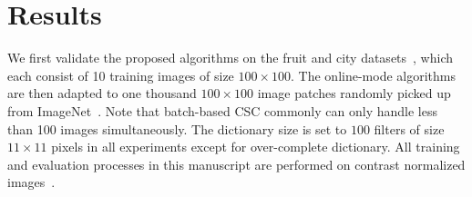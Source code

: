\section{Results} \label{sec:result}
We first validate the proposed algorithms on the fruit and city
datasets~\cite{zeiler2010deconvolutional}, which each consist of 10
training images of size $100 \times 100$. The online-mode algorithms
are then adapted to one thousand $100 \times 100$ image patches
randomly picked up from ImageNet~\cite{deng2009imagenet}. Note that
batch-based CSC commonly can only handle less than 100 images
simultaneously. The dictionary size is set to $100$ filters of size
$11 \times 11$ pixels in all experiments except for over-complete
dictionary. All training and evaluation processes in this manuscript
are performed on contrast normalized
images~\cite{zeiler2010deconvolutional,heide2015fast}.

